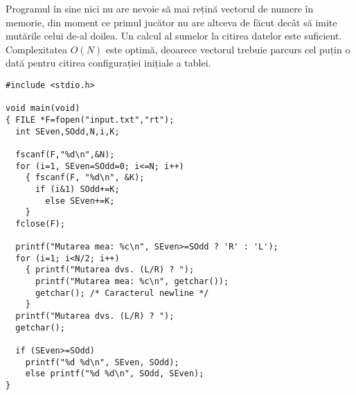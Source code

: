 
Programul în sine nici nu are nevoie să mai rețină vectorul de numere în
memorie, din moment ce primul jucător nu are altceva de făcut decât să imite
mutările celui de-al doilea. Un calcul al sumelor la citirea datelor este
suficient. Complexitatea $O(N)$ este optimă, deoarece vectorul trebuie parcurs
cel puțin o dată pentru citirea configurației inițiale a tablei.

\begin{verbatim}
#include <stdio.h>

void main(void)
{ FILE *F=fopen("input.txt","rt");
  int SEven,SOdd,N,i,K;

  fscanf(F,"%d\n",&N);
  for (i=1, SEven=SOdd=0; i<=N; i++)
    { fscanf(F, "%d\n", &K);
      if (i&1) SOdd+=K;
        else SEven+=K;
    }
  fclose(F);

  printf("Mutarea mea: %c\n", SEven>=SOdd ? 'R' : 'L');
  for (i=1; i<N/2; i++)
    { printf("Mutarea dvs. (L/R) ? ");
      printf("Mutarea mea: %c\n", getchar());
      getchar(); /* Caracterul newline */
    }
  printf("Mutarea dvs. (L/R) ? ");
  getchar();

  if (SEven>=SOdd)
    printf("%d %d\n", SEven, SOdd);
    else printf("%d %d\n", SOdd, SEven);
}
\end{verbatim}

